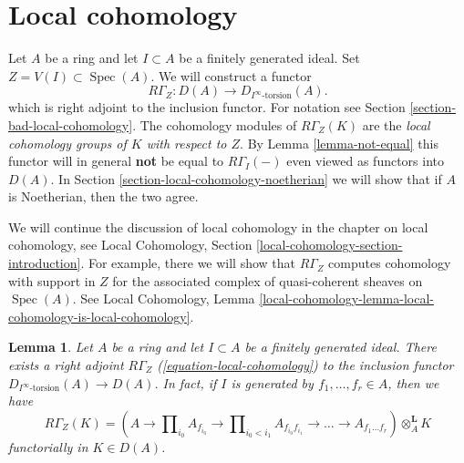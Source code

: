 \documentclass{stacks-project}
\theoremstyle{plain}
\newtheorem{lemma}[subsection]{Lemma}
\theoremstyle{definition}
\theoremstyle{remark}
\numberwithin{equation}{subsection}
\def\Spec{\mathop{\mathrm{Spec}}}
\begin{document}
\section{Local cohomology}
\label{section-local-cohomology}

\noindent
Let $A$ be a ring and let $I \subset A$ be a finitely generated ideal.
Set $Z = V(I) \subset \Spec(A)$. We will construct a functor
\begin{equation}
\label{equation-local-cohomology}
R\Gamma_Z : D(A) \longrightarrow D_{I^\infty\text{-torsion}}(A).
\end{equation}
which is right adjoint to the inclusion functor. For notation
see Section \ref{section-bad-local-cohomology}. The cohomology
modules of $R\Gamma_Z(K)$ are the {\it local cohomology groups
of $K$ with respect to $Z$}.
By Lemma \ref{lemma-not-equal} this functor will in general {\bf not} be
equal to $R\Gamma_I( - )$ even viewed as functors into $D(A)$.
In Section \ref{section-local-cohomology-noetherian}
we will show that if $A$ is Noetherian, then the two agree.

\medskip\noindent
We will continue the discussion of local cohomology in
the chapter on local cohomology, see
Local Cohomology, Section \ref{local-cohomology-section-introduction}.
For example, there we will show that $R\Gamma_Z$ computes cohomology
with support in $Z$ for the associated complex of quasi-coherent sheaves
on $\Spec(A)$. See Local Cohomology, Lemma
\ref{local-cohomology-lemma-local-cohomology-is-local-cohomology}.


\begin{lemma}
\label{lemma-local-cohomology-adjoint}
Let $A$ be a ring and let $I \subset A$ be a finitely generated ideal.
There exists a right adjoint $R\Gamma_Z$ (\ref{equation-local-cohomology})
to the inclusion functor $D_{I^\infty\text{-torsion}}(A) \to D(A)$.
In fact, if $I$ is generated by $f_1, \ldots, f_r \in A$, then we have
$$
R\Gamma_Z(K) =
(A \to \prod\nolimits_{i_0} A_{f_{i_0}} \to
\prod\nolimits_{i_0 < i_1} A_{f_{i_0}f_{i_1}}
\to \ldots \to A_{f_1\ldots f_r}) \otimes_A^\mathbf{L} K
$$
functorially in $K \in D(A)$.
\end{lemma}
\end{document}
